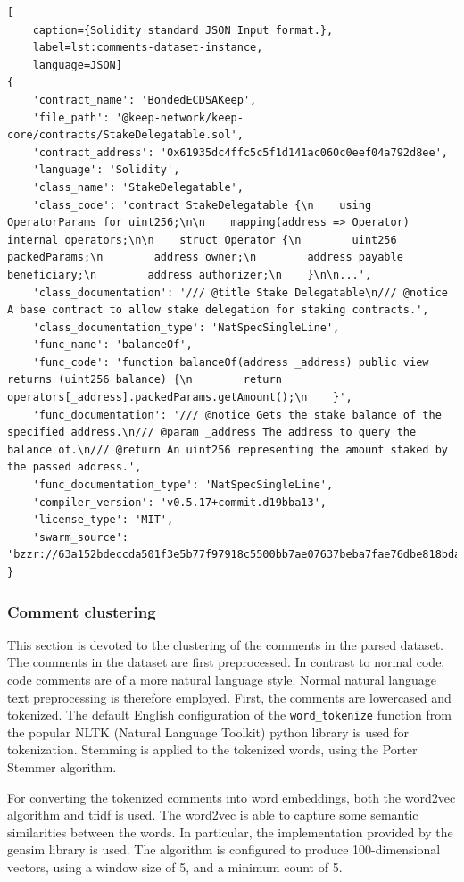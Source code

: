 \begin{lstlisting}[
    caption={Solidity standard JSON Input format.},
    label=lst:comments-dataset-instance,
    language=JSON]
{
    'contract_name': 'BondedECDSAKeep',
    'file_path': '@keep-network/keep-core/contracts/StakeDelegatable.sol',
    'contract_address': '0x61935dc4ffc5c5f1d141ac060c0eef04a792d8ee',
    'language': 'Solidity',
    'class_name': 'StakeDelegatable',
    'class_code': 'contract StakeDelegatable {\n    using OperatorParams for uint256;\n\n    mapping(address => Operator) internal operators;\n\n    struct Operator {\n        uint256 packedParams;\n        address owner;\n        address payable beneficiary;\n        address authorizer;\n    }\n\n...',
    'class_documentation': '/// @title Stake Delegatable\n/// @notice A base contract to allow stake delegation for staking contracts.',
    'class_documentation_type': 'NatSpecSingleLine',
    'func_name': 'balanceOf',
    'func_code': 'function balanceOf(address _address) public view returns (uint256 balance) {\n        return operators[_address].packedParams.getAmount();\n    }',
    'func_documentation': '/// @notice Gets the stake balance of the specified address.\n/// @param _address The address to query the balance of.\n/// @return An uint256 representing the amount staked by the passed address.',
    'func_documentation_type': 'NatSpecSingleLine',
    'compiler_version': 'v0.5.17+commit.d19bba13',
    'license_type': 'MIT',
    'swarm_source': 'bzzr://63a152bdeccda501f3e5b77f97918c5500bb7ae07637beba7fae76dbe818bda4'
}  
\end{lstlisting}

\subsubsection{Comment clustering}
\label{sec:comment-clustering}
This section is devoted to the clustering of the comments in the parsed dataset. The comments in the dataset are first preprocessed. In contrast to normal code, code comments are of a more natural language style. Normal natural language text preprocessing is therefore employed. First, the comments are lowercased and tokenized. The default English configuration of the \lstinline[language=Python]!word_tokenize! function from the popular NLTK (Natural Language Toolkit) \cite{nltk} python library is used for tokenization. Stemming is applied to the tokenized words, using the Porter Stemmer algorithm.

For converting the tokenized comments into word embeddings, both the word2vec algorithm \cite{word2vec} and \acrfull{tfidf} is used. The word2vec is able to capture some semantic similarities between the words. In particular, the implementation provided by the gensim library \cite{gensim} is used. The algorithm is configured to produce 100-dimensional vectors, using a window size of 5, and a minimum count of 5. 

